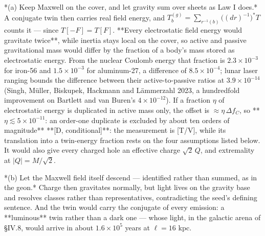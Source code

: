 *(a) Keep Maxwell on the cover, and let gravity sum over sheets as Law I does.* A conjugate twin then carries real field energy, and $T^{(g)}_b = \sum_{r^{-1}(b)}\big((dr)^{-1}\big)^*T$ counts it — since $T[-F] = T[F]$. **Every electrostatic field energy would gravitate twice**, while inertia stays local on the cover, so active and passive gravitational mass would differ by the fraction of a body's mass stored as electrostatic energy. From the nuclear Coulomb energy that fraction is $2.3\times10^{-3}$ for iron-56 and $1.5\times10^{-3}$ for aluminum-27, a difference of $8.5\times10^{-4}$; lunar laser ranging bounds the difference between their active-to-passive ratios at $3.9\times10^{-14}$ (Singh, Müller, Biskupek, Hackmann and Lämmerzahl 2023, a hundredfold improvement on Bartlett and van Buren's $4\times10^{-12}$). If a fraction $\eta$ of electrostatic energy is duplicated in active mass only, the offset is $\approx\eta\,\Delta f_C$, so **$\eta\lesssim5\times10^{-11}$: an order-one duplicate is excluded by about ten orders of magnitude** **[D, conditional]**: the measurement is [T/V], while its translation into a twin-energy fraction rests on the four assumptions listed below. It would also give every charged hole an effective charge $\sqrt2\,Q$, and extremality at $|Q| = M/\sqrt2$.

*(b) Let the Maxwell field itself descend — identified rather than summed, as in the geon.* Charge then gravitates normally, but light lives on the gravity base and resolves classes rather than representatives, contradicting the seed's defining sentence. And the twin would carry the conjugate of every emission: a **luminous** twin rather than a dark one — whose light, in the galactic arena of §IV.8, would arrive in about $1.6\times10^5$ years at $\ell = 16$ kpc.

